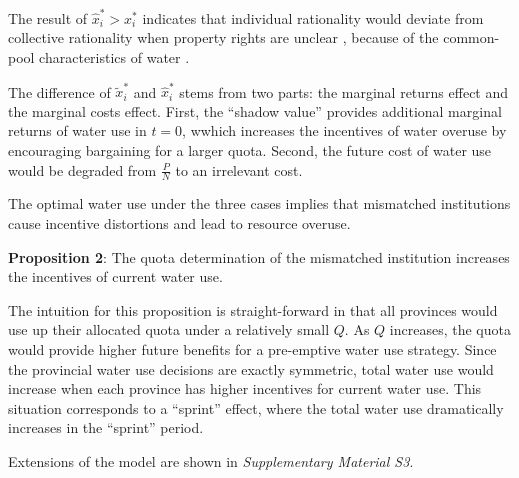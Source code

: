 The result of $\hat x_i^*>x_i^*$ indicates that individual rationality would deviate from collective rationality when property rights are unclear \cite{hardinTragedyCommons2009}, because of the common-pool characteristics of water
\cite{castilla-rhoGroundwaterCommonPool2020,ostromGeneralFrameworkAnalyzing2009}.

The difference of $\widetilde x_i^*$ and $\hat x_i^*$ stems from two parts: the marginal returns effect and the marginal costs effect. First, the “shadow value” provides additional marginal returns of water use in $t=0$, wwhich increases the incentives of water overuse by encouraging bargaining for a larger quota. Second, the future cost of water use would be degraded from $\frac{P}{N}$ to an irrelevant cost.

The optimal water use under the three cases implies that mismatched institutions cause incentive distortions and lead to resource overuse.

\textbf{Proposition 2}: The quota determination of the mismatched institution increases the incentives of current water use.

The intuition for this proposition is straight-forward in that all provinces would use up their allocated quota under a relatively small $Q$. As $Q$ increases, the quota would provide higher future benefits for a pre-emptive water use strategy. Since the provincial water use decisions are exactly symmetric, total water use would increase when each province has higher incentives for current water use. This situation corresponds to a “sprint” effect, where the total water use dramatically increases in the “sprint” period.

Extensions of the model are shown in \textit{Supplementary Material S3}.
